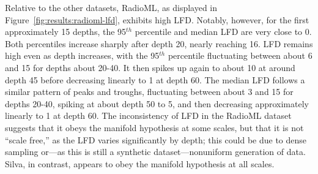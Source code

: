 Relative to the other datasets, RadioML, as displayed in Figure~\ref{fig:results:radioml-lfd}, exhibits high LFD.
Notably, however, for the first approximately 15 depths, the 95$^{th}$ percentile and median LFD are very close to 0.
Both percentiles increase sharply after depth 20, nearly reaching 16.
LFD remains high even as depth increases, with the 95$^{th}$ percentile fluctuating between about 6 and 15 for depths about 20-40.
It then spikes up again to about 10 at around depth 45 before decreasing linearly to 1 at depth 60.
The median LFD follows a similar pattern of peaks and troughs, fluctuating between about 3 and 15 for depths 20-40, spiking at about depth 50 to 5, and then decreasing approximately linearly to 1 at depth 60. The inconsistency of LFD in the RadioML dataset suggests that it obeys the manifold hypothesis at some scales, but that it is not ``scale free,'' as the LFD varies significantly by depth; this could be due to dense sampling or---as this is still a synthetic dataset---nonuniform generation of data. Silva, in contrast, appears to obey the manifold hypothesis at all scales.

